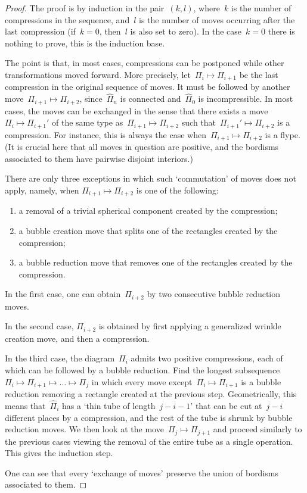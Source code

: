 \documentclass{amsart}
\theoremstyle{theorem}
\theoremstyle{remark}
\theoremstyle{definition}
\numberwithin{equation}{section}
\numberwithin{figure}{section}
\begin{document}
\begin{proof}
The proof is by induction in the pair~$(k,l)$, where~$k$ is the number of compressions
in the sequence, and~$l$ is the number of moves occurring after the last compression (if~$k=0$, then~$l$
is also set to zero). In the case~$k=0$ there is nothing to prove, this is the induction base.

The point is that, in most cases, compressions can be postponed while
other transformations moved forward.
More precisely, let~$\Pi_i\mapsto\Pi_{i+1}$ be the last compression in the original sequence of moves.
It must be followed by another move~$\Pi_{i+1}\mapsto\Pi_{i+2}$, since~$\widehat\Pi_n$ is connected and~$\widehat\Pi_0$ is incompressible.
In most cases,
the moves can be exchanged in the sense that there exists a move~$\Pi_i\mapsto\Pi_{i+1}'$ of the same
type as~$\Pi_{i+1}\mapsto\Pi_{i+2}$ such that~$\Pi_{i+1}'\mapsto\Pi_{i+2}$ is a compression. For instance,
this is always the case when~$\Pi_{i+1}\mapsto\Pi_{i+2}$ is a flype. (It is crucial here that
all moves in question are positive, and the bordisms associated to them have pairwise disjoint
interiors.)

There are only three exceptions in which such `commutation' of moves does not apply, namely,
when $\Pi_{i+1}\mapsto\Pi_{i+2}$ is one of the following:
\begin{enumerate}
\item
a removal of a trivial spherical component created by the compression;
\item
a bubble creation move that splits one of the rectangles created by the compression;
\item
a bubble reduction move that removes one of the rectangles created by the compression.
\end{enumerate}
In the first case, one can obtain~$\Pi_{i+2}$ by two consecutive bubble reduction moves.

In the second case, $\Pi_{i+2}$ is obtained by first applying a generalized wrinkle creation move,
and then a compression.

In the third case, the diagram~$\Pi_i$ admits two positive compressions, each of which
can be followed by a bubble reduction. Find the longest subsequence~$\Pi_i\mapsto\Pi_{i+1}\mapsto\ldots\mapsto\Pi_j$ 
in which every move except~$\Pi_i\mapsto\Pi_{i+1}$ is a bubble reduction removing a rectangle
created at the previous step. Geometrically, this means that~$\widehat\Pi_i$ has a `thin tube of length~$j-i-1$'
that can be cut at~$j-i$ different places by a compression, and the rest of the tube
is shrunk by bubble reduction moves. We then look at the move~$\Pi_j\mapsto\Pi_{j+1}$ and
proceed similarly to the previous cases viewing the removal of the entire tube
as a single operation. This gives the induction step.

One can see that every `exchange of moves' preserve the union of bordisms associated to them.
\end{proof}
\end{document}
